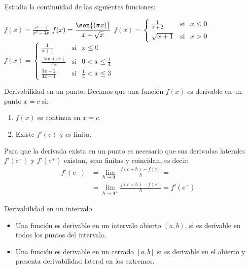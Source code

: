 \begin{ejemplo}{
    Estudia la continuidad de las siguientes funciones:
    \begin{apartados}
        \ap $\displaystyle{
                f(x)=\frac{e^x-1}{x^2-3x}
            }$
        \ap $\displaystyle{
                f(x)=\frac{\sen{(\pi x)}}{x-\sqrt{x}}
            }$
        \ap $\displaystyle{
                f(x)=\left\{\begin{array}{lcc}
                    \displaystyle{\frac1{x+2}} &\text{si}&x\leqslant0\\
                    \sqrt{x+1}&\text{si}&x>0
                \end{array}\right.
            }$
        \ap $\displaystyle{
                f(x)=\left\{\begin{array}{lcc}
                    \displaystyle{\frac1{x+1}}&\text{si}&x\leqslant0\\
                    \displaystyle{\frac{\tan{(\pi x)}}{\pi x}}&\text{si}&0<x\leqslant\displaystyle{\frac14}\\
                    \displaystyle{\frac{3x+2}{4x-1}}&\text{si}&\displaystyle{\frac14}<x\leqslant3
                \end{array}\right.
            }$
    \end{apartados}
}
\end{ejemplo}

\begin{definicion}{Derivabilidad en un punto.}
Decimos que una función $f(x)$ es derivable en un punto $x=c$ si:
\begin{enumerate}
    \item $f(x)$ es continua en $x=c$.
    \item Existe $f'(c)$ y es finita.
\end{enumerate}
Para que la derivada exista en un punto es necesario que sus derivadas laterales $f'(c^-)$ y $f'(c^+)$ existan, sean finitas y coincidan, es decir:
\[
\begin{aligned}
    f'(c^-)&=\lim_{h\to0^-}\frac{f(c+h)-f(c)}{h}=\\
        &=\lim_{h\to0^+}\frac{f(c+h)-f(c)}{h}=f'(c^+)
\end{aligned}
\]
\end{definicion}

\begin{definicion}{Derivabilidad en un intervalo.}
\begin{itemize}
    \item Una función es derivable en un intervalo abierto $(a,b)$, si es derivable en todos los puntos del intervalo.
    \item Una función es derivable en un cerrado $[a,b]$ si es derivable en el abierto y presenta derivabilidad lateral en los extremos.
\end{itemize}
\end{definicion}

